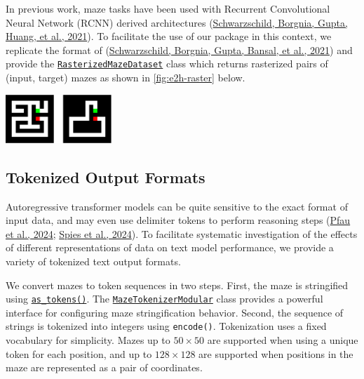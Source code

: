 \documentclass[10pt,a4paper,onecolumn]{article}
\let\origfigure\figure
\let\endorigfigure\endfigure
\renewenvironment{figure}[1][2] {
    \expandafter\origfigure\expandafter[H]
} {
    \endorigfigure
}
\begin{document}
In previous work, maze tasks have been used with Recurrent Convolutional
Neural Network (RCNN) derived architectures
(\protect\hyperlink{ref-deepthinking}{Schwarzschild, Borgnia, Gupta,
Huang, et al., 2021}). To facilitate the use of our package in this
context, we replicate the format of
(\protect\hyperlink{ref-easy_to_hard}{Schwarzschild, Borgnia, Gupta,
Bansal, et al., 2021}) and provide the
\href{https://understanding-search.github.io/maze-dataset/maze_dataset/dataset/rasterized.html\#RasterizedMazeDataset}{\texttt{RasterizedMazeDataset}}
class which returns rasterized pairs of (input, target) mazes as shown
in \autoref{fig:e2h-raster} below.

\begin{figure}
\hypertarget{fig:e2h-raster}{%
\centering
\includegraphics[width=0.3\textwidth,height=\textheight]{figures/maze-raster-input-target.pdf}
\caption{Input is the rasterized maze without the path marked (left),
and provide as a target the maze with all but the correct path removed
(right). Configuration options exist to adjust whether endpoints are
included and if empty cells should be filled in.}\label{fig:e2h-raster}
}
\end{figure}

\hypertarget{tokenized-output-formats}{%
\subsection{Tokenized Output Formats}\label{tokenized-output-formats}}

Autoregressive transformer models can be quite sensitive to the exact
format of input data, and may even use delimiter tokens to perform
reasoning steps (\protect\hyperlink{ref-pfau2024dotbydot}{Pfau et al.,
2024}; \protect\hyperlink{ref-spies2024causalworldmodels}{Spies et al.,
2024}). To facilitate systematic investigation of the effects of
different representations of data on text model performance, we provide
a variety of tokenized text output formats.

We convert mazes to token sequences in two steps. First, the maze is
stringified using
\href{https://understanding-search.github.io/maze-dataset/maze_dataset.html\#MazeDataset.as_tokens}{\texttt{as\_tokens()}}.
The
\href{https://understanding-search.github.io/maze-dataset/maze_dataset/tokenization.html\#MazeTokenizerModular}{\texttt{MazeTokenizerModular}}
class provides a powerful interface for configuring maze stringification
behavior. Second, the sequence of strings is tokenized into integers
using \texttt{encode()}. Tokenization uses a fixed vocabulary for
simplicity. Mazes up to \(50 \times 50\) are supported when using a
unique token for each position, and up to \(128 \times 128\) are
supported when positions in the maze are represented as a pair of
coordinates.
\end{document}

